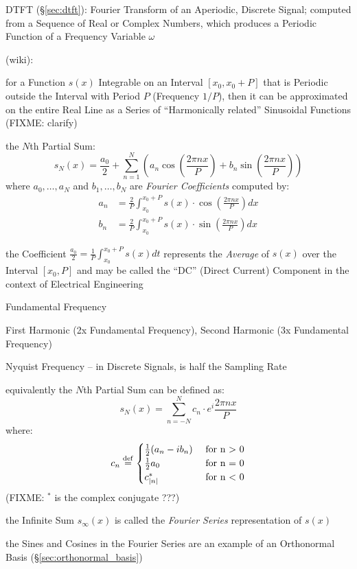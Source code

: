 DTFT (\S\ref{sec:dtft}): Fourier Transform of an Aperiodic, Discrete Signal;
computed from a Sequence of Real or Complex Numbers, which produces a Periodic
Function of a Frequency Variable $\omega$


(wiki):

for a Function $s(x)$ Integrable on an Interval $[x_0,x_0 + P]$ that is
Periodic outside the Interval with Period $P$ (Frequency $1/P$), then it can be
approximated on the entire Real Line as a Series of ``Harmonically related''
Sinusoidal Functions (FIXME: clarify)

the $N$th Partial Sum:
\[
  s_N(x) = \frac{a_0}{2} + \sum_{n=1}^N \left(
    a_n\cos(\frac{2\pi{nx}}{P}) + b_n\sin(\frac{2\pi{nx}}{P})
  \right)
\]
where $a_0,\ldots,a_N$ and $b_1,\ldots,b_N$ are \emph{Fourier Coefficients}
computed by:
\begin{align*}
  a_n & = \frac{2}{P}\int_{x_0}^{x_0+P}s(x) \cdot \cos(\frac{2\pi{nx}}{P}) dx \\
  b_n & = \frac{2}{P}\int_{x_0}^{x_0+P}s(x) \cdot \sin(\frac{2\pi{nx}}{P}) dx
\end{align*}

the Coefficient $\frac{a_0}{2} = \frac{1}{P}\int_{x_0}^{x_0+P}s(x)dt$ represents
the \emph{Average} of $s(x)$ over the Interval $[x_0,P]$ and may be called the
``DC'' (Direct Current) Component in the context of Electrical Engineering

Fundamental Frequency

First Harmonic (2x Fundamental Frequency), Second Harmonic (3x Fundamental
Frequency)

Nyquist Frequency -- in Discrete Signals, is half the Sampling Rate

equivalently the $N$th Partial Sum can be defined as:
\[
  s_N(x) = \sum_{n=-N}^N c_n \cdot e^i\frac{2\pi{nx}}{P}
\]
where:
\[
  c_n \stackrel{\mathrm{def}}= \begin{cases}
    \frac{1}{2}(a_n - ib_n) &\ \text{for n > 0} \\
    \frac{1}{2}a_0          &\ \text{for n = 0} \\
    c_{|n|}^*               &\ \text{for n < 0}
  \end{cases}
\]
(FIXME: $^*$ is the complex conjugate ???)

the Infinite Sum $s_\infty(x)$ is called the \emph{Fourier Series}
representation of $s(x)$

the Sines and Cosines in the Fourier Series are an example of an Orthonormal
Basis (\S\ref{sec:orthonormal_basis})

